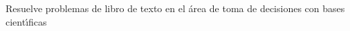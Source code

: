 Resuelve problemas de libro de texto en el \'{a}rea de toma de decisiones
con bases cient\'{\i}ficas
